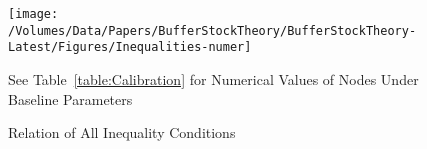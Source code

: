 \begin{figure}[ht]
  \centerline{
    \texttt{[image: /Volumes/Data/Papers/BufferStockTheory/BufferStockTheory-Latest/Figures/Inequalities-numer]}
  }
  \caption{Relation of All Inequality Conditions} \label{fig:InequalitiesNumerical}
\centerline{See Table~\ref{table:Calibration} for Numerical Values of Nodes Under Baseline Parameters}
\end{figure}
